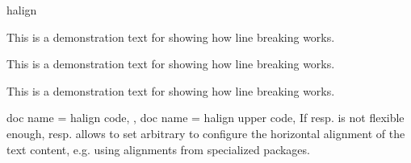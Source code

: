 \begin{docTcbKeys}[
    doc parameter   = {=\meta{alignment}},
    doc description = {no default, initially \texttt{justify}},
    doc new         = 2015-05-07,
  ]
\begin{exdispExample}{halign}
\begin{tcolorbox}[adjusted title=center,halign=center]
This is a demonstration text for showing how line breaking works.
\end{tcolorbox}
\begin{tcolorbox}[adjusted title=left,halign=left]
This is a demonstration text for showing how line breaking works.
\end{tcolorbox}
\begin{tcolorbox}[adjusted title=right,halign upper=right]
This is a demonstration text for showing how line breaking works.
\end{tcolorbox}
\end{exdispExample}

\end{docTcbKeys}

\clearpage

\begin{docTcbKeys}[
    doc parameter   = {=\marg{code}},
    doc description = {no default},
    doc new         = 2022-07-07,
  ]
  {
    {
      doc name = halign code,
    },
    {
      doc name = halign upper code,
    }
  }
  If  resp.  is not flexible enough,
   resp.  allows to set
  arbitrary  to configure the horizontal alignment of the text content,
  e.g. using alignments from specialized packages.
\end{docTcbKeys}


